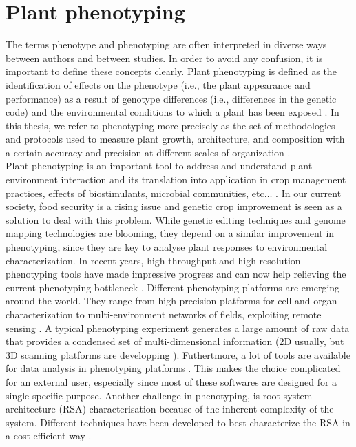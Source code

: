 \section{Plant phenotyping}
The terms phenotype and phenotyping are often interpreted in diverse ways between authors and between studies. In order to avoid any confusion, it is important to define these concepts clearly.
Plant phenotyping is defined as the identification of effects on the phenotype (i.e., the plant appearance and performance) as a result of genotype differences (i.e., differences in the genetic code) and the environmental conditions to which a plant has been exposed \parencite{houle_phenomics:_2010,fiorani_future_2013}. In this thesis, we refer to phenotyping more precisely as the set of methodologies and protocols used to measure plant growth, architecture, and composition with a certain accuracy and precision at different scales of organization \parencite{fiorani_future_2013}.\\
Plant phenotyping is an important tool to address and understand plant environment interaction and its translation into
application in crop management practices, effects of biostimulants, microbial communities, etc$\ldots$
\parencite{pieruschka2019plant}. 
In our current society, food security is a rising issue and genetic crop improvement is seen as a solution to deal with this problem. While genetic editing techniques and genome mapping technologies are blooming, they depend on a similar improvement in phenotyping, since they are key to analyse plant responses to environmental characterization.
In recent years, high-throughput and high-resolution phenotyping tools have made impressive progress and can now help relieving the current phenotyping bottleneck \parencite{tardieu_plant_2017,fiorani_future_2013,furbank_phenomics_2011}.
Different phenotyping platforms are emerging around the world. They range from high-precision platforms for cell and organ characterization \parencite{vargas_mapping_2006} to multi-environment networks of fields, exploiting remote sensing \parencite{virlet_field_2017}. A typical phenotyping experiment generates a large amount of raw data that provides a condensed set of multi-dimensional information (2D usually, but 3D scanning platforms are developping \parencite{mooney_developing_2012}). 
Futhertmore, a lot of tools are available for data analysis in phenotyping platforms \parencite{lobet_online_2013}. This makes the choice complicated for an external user, especially since most of these softwares are designed for a single specific purpose. Another challenge in phenotyping, is root system architecture (RSA) characterisation because of the inherent complexity of the system. Different techniques have been developed to best characterize the RSA in a cost-efficient way \parencite{pound_rootnav:_2013,lobet_novel_2013}. 
